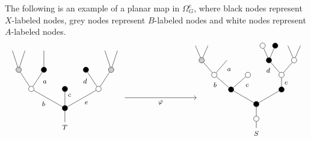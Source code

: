 \documentclass[a4paper,10pt]{article}%
\begin{document}
\begin{example}
The following  is an example of a planar map in $\Omega_G^e$, where black nodes represent $X$-labeled nodes, grey nodes represent $B$-labeled nodes and white nodes represent $A$-labeled nodes.
\begin{equation}\label{REGALTERNMAP EQ}
\begin{tikzpicture}[grow=up,auto,level distance=2.3em,
every node/.style = {font=\footnotesize},
dummy/.style={circle,draw,inner sep=0pt,minimum size=2.25mm}]
	\tikzstyle{level 2}=[sibling distance = 4em]
	\tikzstyle{level 3}=[sibling distance = 3em]
	\tikzstyle{level 4}=[sibling distance = 1.5em]
	\node at (0,0.25) {$T$}
		child{node [dummy,fill = black] {}
			child{node [dummy,fill=white] {}
				child{node [dummy,fill = black!20] {}
					child
					child
				}
				child{node [dummy,fill = black] {}
				edge from parent node [near end] {$d$}}
			edge from parent node [swap] {$e$}}
			child{node [dummy,fill=black] {}
			edge from parent node [swap, near end] {$c$}}
			child{node [dummy,fill=white] {}
				child{node [dummy,fill = black] {}
					child
				edge from parent node [swap, near end] {$a\phantom{d}$}}
				child{node [dummy,fill = black!20] {}
					child
					child
				}
			edge from parent node {$b$}}
		};
\begin{scope}[level distance=1.75em]
	\tikzstyle{level 3}=[sibling distance = 6em]
	\tikzstyle{level 4}=[sibling distance = 4em]
	\tikzstyle{level 5}=[sibling distance = 3em]
	\tikzstyle{level 6}=[sibling distance = 1.5em]
	\tikzstyle{level 7}=[sibling distance = 0.75em]
	\node at (8,0) {$S$}
		child{node [dummy,fill = white] {}
			child{node [dummy,fill = black] {}
				child{node [dummy,fill = black] {}
					child{node [dummy,fill=white] {}
						child{node [dummy,fill = white] {}
							child
							child
						}
						child{node [dummy,fill = black] {}
							child{node [dummy,fill=black] {}
						}
							child{node [dummy,fill=white] {}}
						edge from parent node [near end] {$d$}}
					edge from parent node [swap] {$e\phantom{1}$}}
				}
				child{node [dummy,fill = black] {}
					child{node [dummy,fill=white] {}
					edge from parent node [swap, near end] {$c\phantom{1}$}}
					child{node [dummy,fill=white] {}
						child{
						edge from parent node [swap,near end] {$a\phantom{d}$}}
						child{node [dummy,fill = black!20] {}
							child
							child
						}
					edge from parent node [near end] {$\phantom{1}b$}}
				}
			}
		};
\end{scope}
	\draw [->] (2.5,1.5) -- node [swap] {$\varphi$} (5.5,1.5);
\end{tikzpicture}
\end{equation}
\end{example}
\end{document}
